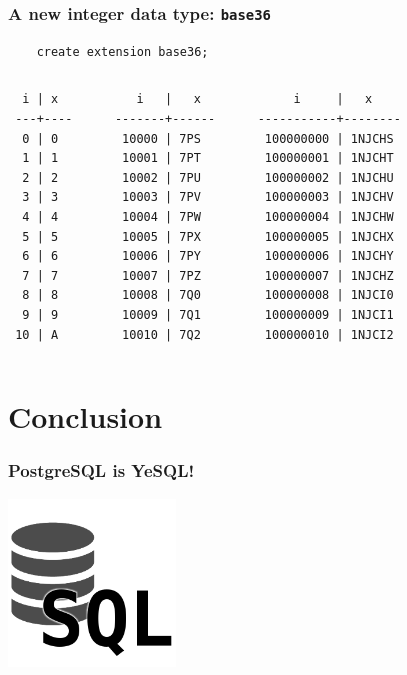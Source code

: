 \documentclass{beamer}
\begin{document}
\begin{frame}[fragile]
  \frametitle{A new integer data type: \texttt{base36}}

  \begin{verbatim}
    create extension base36;
  \end{verbatim}  
  \vfill

\begin{columns}
\begin{verbatim}
  i | x    
 ---+----
  0 | 0
  1 | 1
  2 | 2
  3 | 3
  4 | 4
  5 | 5
  6 | 6
  7 | 7
  8 | 8
  9 | 9
 10 | A
\end{verbatim}  
\begin{verbatim}     
    i   |   x    
 -------+------
  10000 | 7PS
  10001 | 7PT
  10002 | 7PU
  10003 | 7PV
  10004 | 7PW
  10005 | 7PX
  10006 | 7PY
  10007 | 7PZ
  10008 | 7Q0
  10009 | 7Q1
  10010 | 7Q2
\end{verbatim}  
\begin{verbatim}     
      i     |   x    
 -----------+--------
  100000000 | 1NJCHS
  100000001 | 1NJCHT
  100000002 | 1NJCHU
  100000003 | 1NJCHV
  100000004 | 1NJCHW
  100000005 | 1NJCHX
  100000006 | 1NJCHY
  100000007 | 1NJCHZ
  100000008 | 1NJCI0
  100000009 | 1NJCI1
  100000010 | 1NJCI2
\end{verbatim}  
\end{columns}
\end{frame}

\section{Conclusion}

\begin{frame}[fragile]
  \frametitle{PostgreSQL is YeSQL!}

\begin{center}
  \includegraphics[height=12em]{sql-logo.png}
\end{center}
\end{frame}
\end{document}
